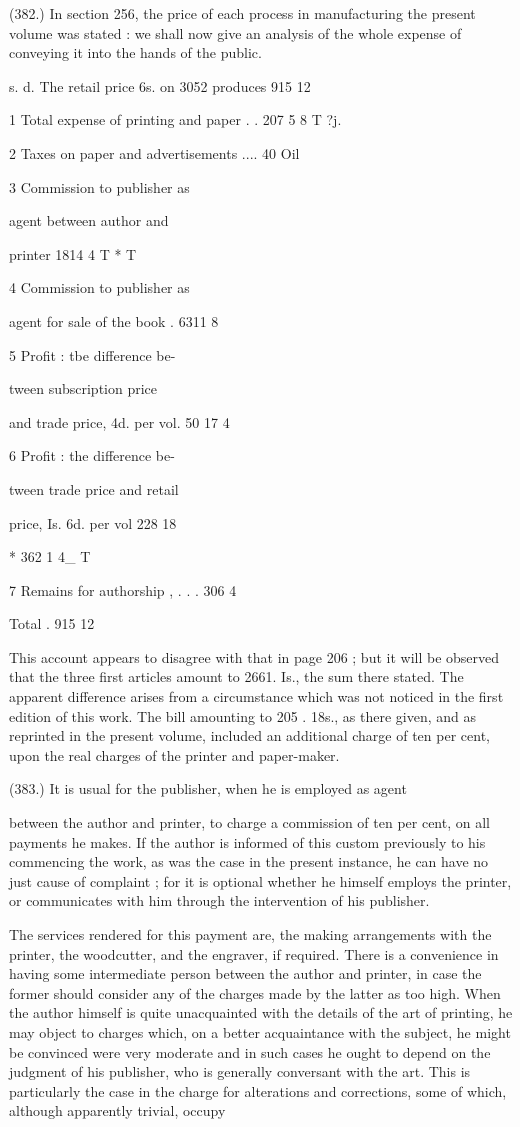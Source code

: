 \documentclass{article}
\begin{document}
(382.) In section 256, the price of each process in manufacturing the present volume was stated : we shall now give an analysis of the whole expense of conveying it into the hands of the public.


s. d. The retail price 6s. on 3052 produces 915 12


1 Total expense of printing and paper . . 207 5 8 T ?j.


2 Taxes on paper and advertisements .... 40 Oil


3 Commission to publisher as


agent between author and


printer 1814 4 T * T


4 Commission to publisher as


agent for sale of the book . 6311 8


5 Profit : tbe difference be-


tween subscription price


and trade price, 4d. per vol. 50 17 4


6 Profit : the difference be-


tween trade price and retail


price, Is. 6d. per vol 228 18


* 362 1 4\_ T


7 Remains for authorship , . . . 306 4


Total . 915 12


This account appears to disagree with that in page 206 ; but it will be observed that the three first articles amount to 2661. Is., the sum there stated. The apparent difference arises from a circumstance which was not noticed in the first edition of this work. The bill amounting to 205 . 18s., as there given, and as reprinted in the present volume, included an additional charge of ten per cent, upon the real charges of the printer and paper-maker.


(383.) It is usual for the publisher, when he is employed as agent


between the author and printer, to charge a commission of ten per cent, on all payments he makes. If the author is informed of this custom previously to his commencing the work, as was the case in the present instance, he can have no just cause of complaint ; for it is optional whether he himself employs the printer, or communicates with him through the intervention of his publisher.


The services rendered for this payment are, the making arrangements with the printer, the woodcutter, and the engraver, if required. There is a convenience in having some intermediate person between the author and printer, in case the former should consider any of the charges made by the latter as too high. When the author himself is quite unacquainted with the details of the art of printing, he may object to charges which, on a better acquaintance with the subject, he might be convinced were very moderate and in such cases he ought to depend on the judgment of his publisher, who is generally conversant with the art. This is particularly the case in the charge for alterations and corrections, some of which, although apparently trivial, occupy
\end{document}
